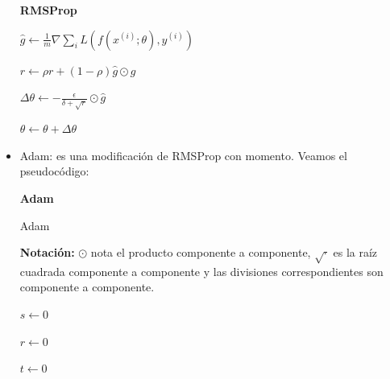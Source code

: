 \begin{itemize}
\begin{algorithm}[H]{\Large{\textbf{RMSProp}}}
{			$\hat{g} \leftarrow \frac{1}{m}\nabla \sum_{i} L(f(x^{(i)};\theta), y^{(i)})$
			
			$r\leftarrow \rho r + (1-\rho)\hat{g}\odot \hat{g}$
			
			$\Delta \theta \leftarrow - \frac{\epsilon}{\delta + \sqrt{r}} \odot \hat{g}$
			
			$\theta \leftarrow \theta + \Delta \theta$
			
		}
		
		\vspace{10px}
		
		
		\vspace{5px}
	\end{algorithm}

	\item Adam: es una modificación de RMSProp con momento. Veamos el pseudocódigo:
	
	\begin{algorithm}[H]{\Large{\textbf{Adam}}}
		
		\vspace{15px}
		
		\caption{Adam}
		\label{alg:Adam}
		\textbf{Notación:} $\odot$ nota el producto componente a componente, $\sqrt{\cdot}$ es la raíz cuadrada componente a componente y las divisiones correspondientes son componente a componente.
		
		\KwIn{Tasas de decaimiento $\rho_1 , \rho_2 \in [0,1)$}
		
		\vspace{10px}
		
		$s\leftarrow 0$
		
		$r\leftarrow 0$
		
		$t\leftarrow 0$
		
\end{algorithm}
\end{itemize}
